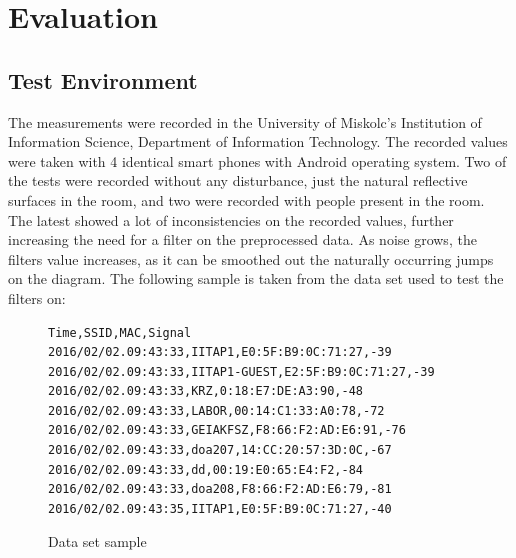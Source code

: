 \chapter{Evaluation}
\label{chap:evaluation}
\section{Test Environment}
The measurements were recorded in the University of Miskolc's Institution of Information Science, Department of Information Technology. The recorded values were taken with 4 identical smart phones with Android operating system. Two of the tests were recorded without any disturbance, just the natural reflective surfaces in the room, and two were recorded with people present in the room. The latest showed a lot of inconsistencies on the recorded values, further increasing the need for a filter on the preprocessed data. As noise grows, the filters value increases, as it can be smoothed out the naturally occurring  jumps on the diagram.
The following sample is taken from the data set used to test the filters on:
\begin{figure}[h!]
\begin{verbatim}
Time,SSID,MAC,Signal
2016/02/02.09:43:33,IITAP1,E0:5F:B9:0C:71:27,-39
2016/02/02.09:43:33,IITAP1-GUEST,E2:5F:B9:0C:71:27,-39
2016/02/02.09:43:33,KRZ,0:18:E7:DE:A3:90,-48
2016/02/02.09:43:33,LABOR,00:14:C1:33:A0:78,-72
2016/02/02.09:43:33,GEIAKFSZ,F8:66:F2:AD:E6:91,-76
2016/02/02.09:43:33,doa207,14:CC:20:57:3D:0C,-67
2016/02/02.09:43:33,dd,00:19:E0:65:E4:F2,-84
2016/02/02.09:43:33,doa208,F8:66:F2:AD:E6:79,-81
2016/02/02.09:43:35,IITAP1,E0:5F:B9:0C:71:27,-40

\end{verbatim}
\caption{Data set sample}
\label{fig:Datasample}
\end{figure}

